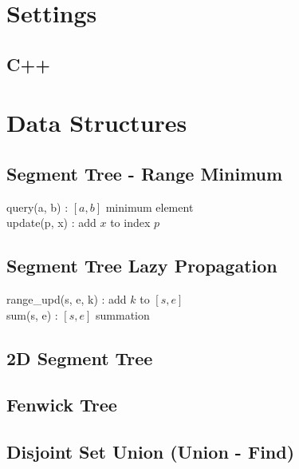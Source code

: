 \documentclass[landscape,8pt]{article}
\begin{document}
\newpage
\begin{multicols}{2}\raggedcolumns
\tableofcontents
\pagebreak
\end{multicols}
\begin{multicols}{2}\raggedcolumns


\section{Settings}
  \subsection{C++}
    

\section{Data Structures}
  \subsection{Segment Tree - Range Minimum}
  query(a, b) : $[a, b]$ minimum element\\
  update(p, x) : add $x$ to index $p$
     
  \pagebreak
  \subsection{Segment Tree Lazy Propagation}
  range\_upd(s, e, k) : add $k$ to $[s, e]$\\
  sum(s, e) : $[s, e]$ summation
     
  \pagebreak
  \subsection{2D Segment Tree}
    

  \subsection{Fenwick Tree}
    

  \subsection{Disjoint Set Union (Union - Find)}
    


\end{multicols}
\end{document}
